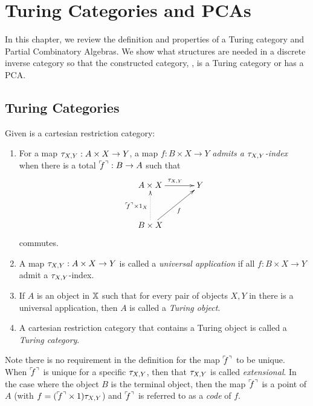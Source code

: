 \chapter{Turing Categories and PCAs} %
\label{chap:turing_categories}

In this chapter, we review the definition and properties of a Turing
category\cite{cockett-hostra08-intro-to-turing} and Partial Combinatory Algebras. We show what
structures are needed in a discrete inverse category \X so that the constructed category, \Xt, is a
Turing category or has a PCA.

\section{Turing Categories}
\label{sec:turing_category_definitions}


\begin{definition}\label{def:turing_category}
  Given \X is a cartesian restriction category:
  \begin{enumerate}
    \item For a map $\tau_{{X},{Y}}: A \times X \to Y$, a map $f:B\times X \to Y$ \emph{admits a $\tau_{{X},{Y}}$-index}
      when there is a total ${}^\ulcorner\!\!f^\urcorner:B\to A$ such that
      \[
        \xymatrix@C+10pt@R+10pt{
          A\times X \ar[r]^{\txy} & Y \\
          B\times X \ar@{.>}[u]^{\code{f}\times 1_X} \ar[ur]_f
        }
      \]
      commutes.\label{defitem:turing_admit_txy_index}
    \item A map $\tau_{{X},{Y}}: A \times X \to Y$ is called a \emph{universal application} if all
      $f:B\times X \to Y$ admit a $\tau_{{X},{Y}}$-index.\label{defitem:turing_universal_application}
    \item If $A$ is an object in $\mathbb{X}$ such that for every pair of objects $X,Y$ in \X there is
      a universal application, then $A$ is called a \emph{Turing object}.
    \item A cartesian restriction category that contains a Turing object is called a
      \emph{Turing category}.
  \end{enumerate}
\end{definition}

Note there is no requirement in the definition for the map ${}^\ulcorner\!\!f^\urcorner$ to be unique. When ${}^\ulcorner\!\!f^\urcorner$ is unique
for a specific $\tau_{{X},{Y}}$, then that $\tau_{{X},{Y}}$ is called \emph{extensional}. In the case where the object
$B$ is the terminal object, then the map ${}^\ulcorner\!\!f^\urcorner$ is a point of $A$ (with $f = ({}^\ulcorner\!\!f^\urcorner \times 1)\tau_{{X},{Y}}$) and
${}^\ulcorner\!\!f^\urcorner$ is referred to as a \emph{code} of $f$.

